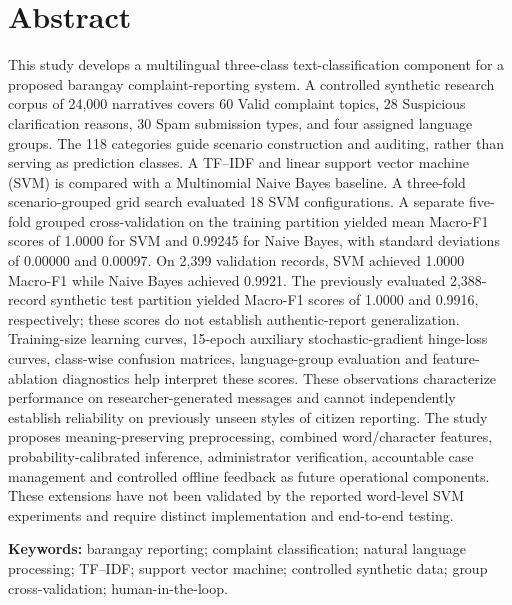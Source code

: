 \documentclass[12pt,oneside,openany]{book}
\begin{document}
\chapter*{Abstract}
This study develops a multilingual three-class text-classification component for a proposed barangay complaint-reporting system. A controlled synthetic research corpus of 24,000 narratives covers 60 Valid complaint topics, 28 Suspicious clarification reasons, 30 Spam submission types, and four assigned language groups. The 118 categories guide scenario construction and auditing, rather than serving as prediction classes. A TF--IDF and linear support vector machine (SVM) is compared with a Multinomial Naive Bayes baseline. A three-fold scenario-grouped grid search evaluated 18 SVM configurations. A separate five-fold grouped cross-validation on the training partition yielded mean Macro-F1 scores of 1.0000 for SVM and 0.99245 for Naive Bayes, with standard deviations of 0.00000 and 0.00097. On 2,399 validation records, SVM achieved 1.0000 Macro-F1 while Naive Bayes achieved 0.9921. The previously evaluated 2,388-record synthetic test partition yielded Macro-F1 scores of 1.0000 and 0.9916, respectively; these scores do not establish authentic-report generalization. Training-size learning curves, 15-epoch auxiliary stochastic-gradient hinge-loss curves, class-wise confusion matrices, language-group evaluation and feature-ablation diagnostics help interpret these scores. These observations characterize performance on researcher-generated messages and cannot independently establish reliability on previously unseen styles of citizen reporting. The study proposes meaning-preserving preprocessing, combined word/character features, probability-calibrated inference, administrator verification, accountable case management and controlled offline feedback as future operational components. These extensions have not been validated by the reported word-level SVM experiments and require distinct implementation and end-to-end testing. 
\par\medskip\textbf{Keywords:} barangay reporting; complaint classification; natural language processing; TF--IDF; support vector machine; controlled synthetic data; group cross-validation; human-in-the-loop.
\tableofcontents
\listoffigures
\listoftables
\mainmatter








\backmatter
\renewcommand{\bibname}{References}
\cleardoublepage{}

\end{document}
